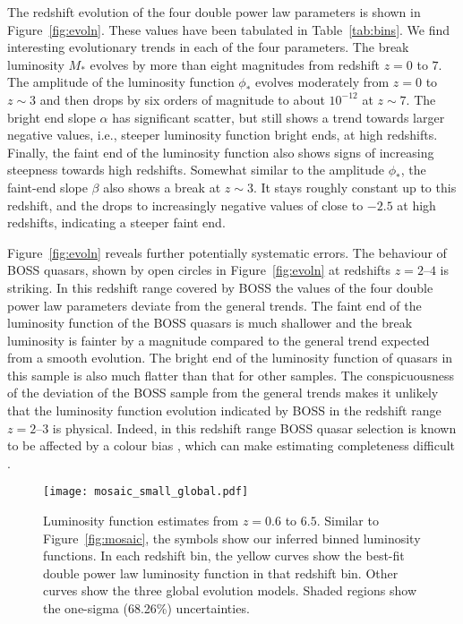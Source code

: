 \documentclass[fleqn,usenatbib]{mnras}
\begin{document}
      The redshift evolution of the four double power law parameters is
      shown in Figure~\ref{fig:evoln}.  These values have been tabulated in
      Table~\ref{tab:bins}.  We find interesting evolutionary trends in each
      of the four parameters.  The break luminosity $M_*$ evolves by more
      than eight magnitudes from redshift $z=0$ to $7$.  The amplitude of
      the luminosity function $\phi_*$ evolves moderately from $z=0$ to
      $z\sim 3$ and then drops by six orders of magnitude to about
      $10^{-12}$ at $z\sim 7$.  The bright end slope $\alpha$ has
      significant scatter, but still shows a trend towards larger negative
      values, i.e., steeper luminosity function bright ends, at high
      redshifts.  Finally, the faint end of the luminosity function also
      shows signs of increasing steepness towards high redshifts.  Somewhat
      similar to the amplitude $\phi_*$, the faint-end slope $\beta$ also
      shows a break at $z\sim 3$.  It stays roughly constant up to this
      redshift, and the drops to increasingly negative values of close to
      $-2.5$ at high redshifts, indicating a steeper faint end.

      Figure~\ref{fig:evoln} reveals further potentially systematic errors.
      The behaviour of BOSS quasars, shown by open circles in
      Figure~\ref{fig:evoln} at redshifts $z=2$--$4$ is striking.  In this
      redshift range covered by BOSS the values of the four double power law
      parameters deviate from the general trends.  The faint end of the
      luminosity function of the BOSS quasars is much shallower and the
      break luminosity is fainter by a magnitude compared to the general
      trend expected from a smooth evolution.  The bright end of the
      luminosity function of quasars in this sample is also much flatter
      than that for other samples.  The conspicuousness of the deviation of
      the BOSS sample from the general trends makes it unlikely that the
      luminosity function evolution indicated by BOSS in the redshift range
      $z=2$--$3$ is physical.  Indeed, in this redshift range BOSS quasar
      selection is known to be affected by a colour bias
      \citep{2011ApJ...728...23W}, which can make estimating completeness
      difficult \citep{2006AJ....131.2766R}.  

      \begin{figure*}
        \begin{center}
          \texttt{[image: mosaic\_small\_global.pdf]}
        \end{center}
        \caption{Luminosity function estimates from $z=0.6$ to $6.5$.
          Similar to Figure~\ref{fig:mosaic}, the symbols show our inferred
          binned luminosity functions.  In each redshift bin, the yellow
          curves show the best-fit double power law luminosity function in
          that redshift bin.  Other curves show the three global evolution
          models.  Shaded regions show the one-sigma (68.26\%)
          uncertainties.}
        \label{fig:mosaic_global}
      \end{figure*}
\end{document}
